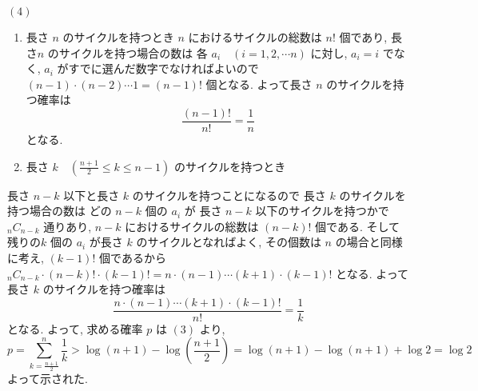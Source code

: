 \documentclass[../main]{subfiles}
\begin{document}
 \setcounter{prob}{3}
 \prob
 $(4)$
 \begin{pf}
  \begin{enumerate}
   \item 長さ $n$ のサイクルを持つとき
   $n$ におけるサイクルの総数は $n!$ 個であり,
   長さ$n$ のサイクルを持つ場合の数は
   各 $a_i \quad (i = 1, 2, \cdots n)$ に対し,
   $a_i = i$ でなく, $a_i$ がすでに選んだ数字でなければよいので
   $ (n - 1) \cdot (n - 2) \cdots 1 = (n - 1)!$ 個となる.
   よって長さ $n$ のサイクルを持つ確率は
   \begin{equation*}
    \frac{(n - 1)!} {n!} = \frac{1} {n}
   \end{equation*}
  となる.
   \item 長さ $k \quad (\frac{n+1} {2} \le k \le n - 1)$ のサイクルを持つとき
  \end{enumerate}
  長さ $n - k$ 以下と長さ $k$ のサイクルを持つことになるので
  長さ $k$ のサイクルを持つ場合の数は
  どの  $n - k$ 個の $a_{i}$ が
  長さ $n - k$ 以下のサイクルを持つかで $_n C _{n - k}$ 通りあり,
  $n - k$ におけるサイクルの総数は $(n - k)!$ 個である.
  そして残りの$k$ 個の $a_i$ が長さ $k$ のサイクルとなればよく,
  その個数は $n$ の場合と同様に考え,  $(k - 1)!$ 個であるから
  $_n C _{n - k} \cdot (n - k)! \cdot (k - 1)!
  = n \cdot (n - 1) \cdots (k + 1) \cdot (k - 1)!$
  となる.
  よって長さ $k$ のサイクルを持つ確率は
   \begin{equation*}
    \frac{n \cdot (n - 1) \cdots (k + 1) \cdot (k - 1)!} {n!} = \frac{1} {k}
   \end{equation*}
  となる.
  \setcounter{prob}{3}
  よって, 求める確率 $p$ は \prob $(3)$ より,
  \begin{equation*}
    p = \sum _{k = \frac{n + 1} {2}} ^ {n} {\frac{1} {k}}
   > \log(n + 1) - \log \left(\frac{n + 1} {2} \right)
   =  \log(n + 1) - \log(n + 1) + \log2
   =\log2
  \end{equation*}
  よって示された.
 \end{pf}
\end{document}
